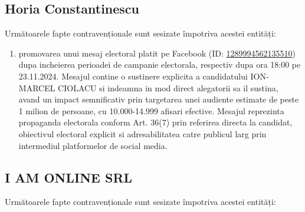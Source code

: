 \documentclass[a4paper,12pt]{article}
\begin{document}
\vspace{0.5cm}

\subsection{Horia Constantinescu}
Următoarele fapte contravenționale sunt sesizate împotriva acestei entități:

\begin{enumerate}[leftmargin=*, label=\arabic*.)]
    \item promovarea unui mesaj electoral platit pe Facebook (ID: \href{https://www.facebook.com/ads/library/?id=1289994562135510}{1289994562135510}) dupa incheierea perioadei de campanie electorala, respectiv dupa ora 18:00 pe 23.11.2024. Mesajul contine o sustinere explicita a candidatului ION-MARCEL CIOLACU si indeamna in mod direct alegatorii sa il sustina, avand un impact semnificativ prin targetarea unei audiente estimate de peste 1 milion de persoane, cu 10.000-14.999 afisari efective. Mesajul reprezinta propaganda electorala conform Art. 36(7) prin referirea directa la candidat, obiectivul electoral explicit si adresabilitatea catre publicul larg prin intermediul platformelor de social media.
\end{enumerate}

\vspace{0.5cm}

\subsection{I AM ONLINE SRL}
Următoarele fapte contravenționale sunt sesizate împotriva acestei entități:
\end{document}
